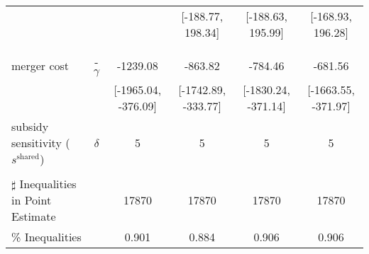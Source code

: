 \begin{tabular}{@{\extracolsep{5pt}}lccccc}
 &  &  & [-188.77, 198.34] & [-188.63, 195.99] & [-168.93, 196.28] \\
 &  &  &  &  &  \\
 &  &  &  &  &  \\
merger cost & -$\gamma$ & -1239.08 & -863.82 & -784.46 & -681.56 \\
 &  & [-1965.04, -376.09] & [-1742.89, -333.77] & [-1830.24, -371.14] & [-1663.55, -371.97] \\
subsidy sensitivity ($s^{\text{shared}}$) & $\delta$ & 5 & 5 & 5 & 5 \\
 &  &  &  &  &  \\
\hline 
$\sharp$ Inequalities in Point Estimate &  & 17870 & 17870 & 17870 & 17870 \\
\% Inequalities &  & 0.901 & 0.884 & 0.906 & 0.906 \\
\bottomrule 
\end{tabular}

